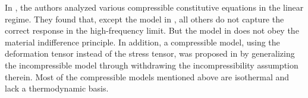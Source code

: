 \documentclass{article}
\theoremstyle{plain}
\begin{document}
In \cite{chakraborty2015constitutive}, the authors analyzed various compressible constitutive equations in the linear regime. They found that, except the model in \cite{yong2014newtonian}, all others do not capture the correct response in the high-frequency limit.
But the model in \cite{yong2014newtonian} does not obey the material indifference principle.
In addition, a compressible model, using the deformation tensor instead of the stress tensor, was proposed in \cite{qian2010global,hu2011global} by generalizing the incompressible model \cite{lin2005hydrodynamics} through withdrawing the incompressibility assumption therein.
Most of the compressible models mentioned above are isothermal and lack a thermodynamic basis.
\end{document}
